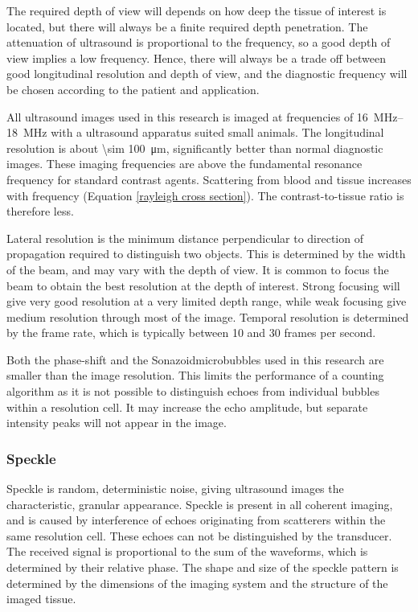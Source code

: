 The required depth of view will depends on how deep the tissue of interest is located, but there will always be a finite required depth penetration. The attenuation of ultrasound is proportional to the frequency, so a good depth of view implies a low frequency. Hence, there will always be a trade off between good longitudinal resolution and depth of view, and the diagnostic frequency will be chosen according to the patient and application. 

All ultrasound images used in this research is imaged at frequencies of \SIrange{16}{18}{\mega\hertz} with a ultrasound apparatus suited small animals. The longitudinal resolution is about \SI{\sim 100}{\micro\meter}, significantly better than normal diagnostic images. These imaging frequencies are above the fundamental resonance frequency for standard contrast agents. Scattering from blood and tissue increases with frequency (Equation \eqref{rayleigh cross section}). The contrast-to-tissue ratio is therefore less. 

Lateral resolution is the minimum distance perpendicular to direction of propagation required to distinguish two objects. This is determined by the width of the beam, and may vary with the depth of view. It is common to focus the beam to obtain the best resolution at the depth of interest. Strong focusing will give very good resolution at a very limited depth range, while weak focusing give medium resolution through most of the image. Temporal resolution is determined by the frame rate, which is typically between 10 and 30 frames per second. 

Both the phase-shift and the Sonazoid\texttrademark microbubbles used in this research are smaller than the image resolution. This limits the performance of a counting algorithm as it is not possible to distinguish echoes from individual bubbles within a resolution cell. It may increase the echo amplitude, but separate intensity peaks will not appear in the image.


\subsubsection{Speckle}
Speckle is random, deterministic noise, giving ultrasound images the characteristic, granular appearance. Speckle is present in all coherent imaging, and is caused by interference of echoes originating from scatterers within the same resolution cell. These echoes can not be distinguished by the transducer. The received signal is proportional to the sum of the waveforms, which is determined by their relative phase. The shape and size of the speckle pattern is determined by the dimensions of the imaging system and the structure of the imaged tissue\cite{Szabo2013}.


